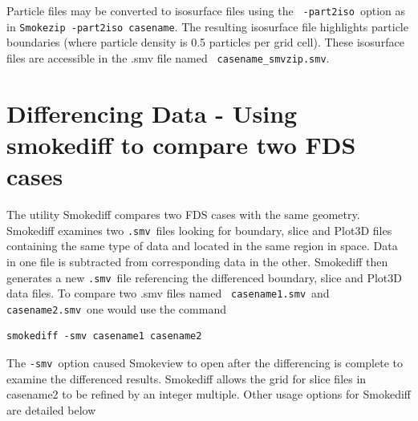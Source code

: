 \documentclass[11pt,twoside]{book}
\begin{document}
Particle files may be converted to isosurface files using the {\tt
-part2iso}\ option as in {\tt Smokezip -part2iso casename}.  The
resulting isosurface file highlights particle boundaries (where
particle density is 0.5 particles per grid cell). These isosurface
files are accessible in the .smv file named {\tt
casename\_smvzip.smv}.

\section{Differencing Data - Using smokediff to compare two FDS cases}
\label{ch:smokediff}
The utility Smokediff compares two FDS cases with the same
geometry.  Smokediff examines two {\tt .smv}\ files looking for
boundary, slice and Plot3D files containing the same type of data
and located in the same region in space. Data in one file is subtracted from corresponding data in the
other.  Smokediff then generates a new {\tt .smv}\ file referencing the differenced boundary,
slice and Plot3D data files. To compare two .smv files named {\tt
casename1.smv}\ and {\tt casename2.smv}\ one would use the command

\begin{lstlisting}
smokediff -smv casename1 casename2
\end{lstlisting}

\noindent The {\tt -smv}\ option caused Smokeview to open after the differencing is complete to examine the differenced results.
Smokediff allows the grid for slice files in casename2 to be
refined by an integer multiple.  Other usage options for Smokediff are
detailed below


\end{document}
